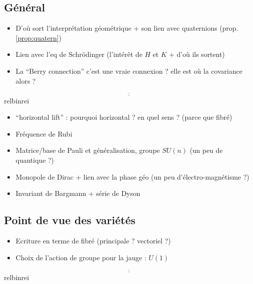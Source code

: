 \subsection{Général}

\begin{itemize}
	\item D'où sort l'interprétation géométrique + son lien avec quaternions (prop. \ref{prop:quatern})
	\item Lien avec l'eq de Schrödinger (l'intérêt de $H$ et $K$ + d'où ils sortent)
	
	\item La ``Berry connection'' c'est une vraie connexion ? elle est où la covariance alors ?
\end{itemize}

\[\underline{\overline{\qquad\qquad\qquad\qquad\qquad\qquad\qquad\qquad\qquad\qquad\qquad\qquad\qquad\qquad\qquad\qquad\qquad\qquad}}\]{\color{white}relbinrei}

\begin{itemize}
	\item ``horizontal lift'' : pourquoi horizontal ? en quel sens ? (parce que fibré)
	
	\item Fréquence de Rubi
	
	\item Matrice/base de Pauli et généralisation, groupe $SU(n)$ (un peu de quantique ?)
	
	\item Monopole de Dirac + lien avec la phase géo (un peu d'électro-magnétisme ?)
	
	\item Invariant de Bargmann + série de Dyson
\end{itemize}



\subsection{Point de vue des variétés}\label{subsec:phaseG_variete}

\begin{itemize}
	\item Ecriture en terme de fibré (principale ? vectoriel ?)
	
	\item Choix de l'action de groupe pour la jauge : $U(1)$ \apriori
\end{itemize}

\[\underline{\overline{\qquad\qquad\qquad\qquad\qquad\qquad\qquad\qquad\qquad\qquad\qquad\qquad\qquad\qquad\qquad\qquad\qquad\qquad}}\]{\color{white}relbinrei}

